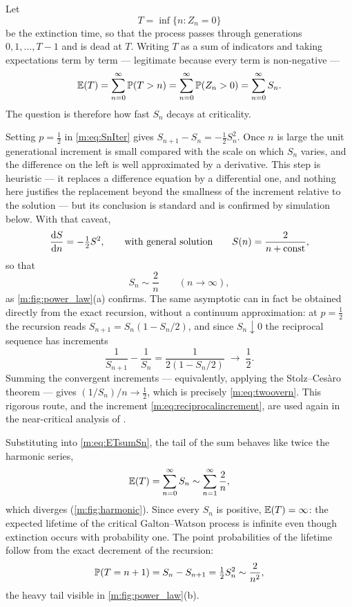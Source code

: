 Let
\begin{equation*}
T = \inf\{n : Z_n = 0\}
\end{equation*}
be the extinction time, so that the process passes through generations
$0,1,\dots,T-1$ and is dead at $T$. Writing $T$ as a sum of indicators and taking
expectations term by term --- legitimate because every term is non-negative ---
\begin{equation}
\label{m:eq:ETsumSn}
\mathbb{E}\!\left(T\right) = \sum_{n=0}^{\infty}\mathbb{P}\!\left(T>n\right) = \sum_{n=0}^{\infty}\mathbb{P}\!\left(Z_n>0\right)
= \sum_{n=0}^{\infty}S_n .
\end{equation}
The question is therefore how fast $S_n$ decays at criticality.

Setting $p=\tfrac12$ in \cref{m:eq:SnIter} gives $S_{n+1}-S_n = -\tfrac12 S_n^2$.
Once $n$ is large the unit generational increment is small compared with the scale
on which $S_n$ varies, and the difference on the left is well approximated by a
derivative. This step is heuristic --- it replaces a difference equation by a
differential one, and nothing here justifies the replacement beyond the smallness
of the increment relative to the solution --- but its conclusion is standard and is
confirmed by simulation below. With that caveat,
\begin{equation*}
\frac{\mathrm{d} S}{\mathrm{d} n} = -\tfrac12 S^2,
\qquad\text{with general solution}\qquad
S(n) = \frac{2}{n+\text{const}},
\end{equation*}
so that
\begin{equation}
\label{m:eq:twoovern}
S_n \sim \frac{2}{n}\qquad(n\to\infty),
\end{equation}
as \cref{m:fig:power_law}(a) confirms. The same asymptotic can in fact be obtained
directly from the exact recursion, without a continuum approximation: at
$p=\tfrac12$ the recursion reads $S_{n+1}=S_n(1-S_n/2)$, and since $S_n\downarrow0$
the reciprocal sequence has increments
\begin{equation}
\label{m:eq:reciprocalincrement}
\frac{1}{S_{n+1}}-\frac{1}{S_n}
= \frac{1}{2(1-S_n/2)} \;\longrightarrow\; \frac12 .
\end{equation}
Summing the convergent increments --- equivalently, applying the Stolz--Ces\`aro
theorem --- gives $(1/S_n)/n\to\tfrac12$, which is precisely
\cref{m:eq:twoovern}. This rigorous route, and the increment
\cref{m:eq:reciprocalincrement}, are used again in the near-critical analysis of
\ChA.

Substituting into \cref{m:eq:ETsumSn}, the tail of the sum behaves like twice the
harmonic series,
\begin{equation*}
\mathbb{E}\!\left(T\right) = \sum_{n=0}^{\infty}S_n \sim \sum_{n=1}^{\infty}\frac{2}{n},
\end{equation*}
which diverges (\cref{m:fig:harmonic}). Since every $S_n$ is positive,
$\mathbb{E}\!\left(T\right)=\infty$: the expected lifetime of the critical Galton--Watson process is
infinite even though extinction occurs with probability one. The point
probabilities of the lifetime follow from the exact decrement of the recursion:
\begin{equation}
\label{m:eq:Ttail}
\mathbb{P}\!\left(T=n+1\right) = S_n - S_{n+1} = \tfrac12S_n^2 \sim \frac{2}{n^2},
\end{equation}
the heavy tail visible in \cref{m:fig:power_law}(b).

